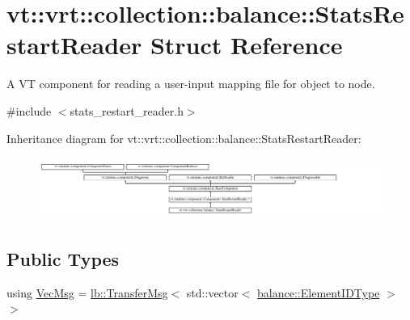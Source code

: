 \hypertarget{structvt_1_1vrt_1_1collection_1_1balance_1_1_stats_restart_reader}{}\section{vt\+:\+:vrt\+:\+:collection\+:\+:balance\+:\+:Stats\+Restart\+Reader Struct Reference}
\label{structvt_1_1vrt_1_1collection_1_1balance_1_1_stats_restart_reader}


A VT component for reading a user-\/input mapping file for object to node.  




{\ttfamily \#include $<$stats\+\_\+restart\+\_\+reader.\+h$>$}

Inheritance diagram for vt\+:\+:vrt\+:\+:collection\+:\+:balance\+:\+:Stats\+Restart\+Reader\+:\begin{figure}[H]
\begin{center}
\leavevmode
\includegraphics[height=2.034884cm]{structvt_1_1vrt_1_1collection_1_1balance_1_1_stats_restart_reader}
\end{center}
\end{figure}
\subsection*{Public Types}
\begin{DoxyCompactItemize}
\item 
using \hyperlink{structvt_1_1vrt_1_1collection_1_1balance_1_1_stats_restart_reader_a7e2a74977e595242bf3abb6c83b7e27b}{Vec\+Msg} = \hyperlink{structvt_1_1vrt_1_1collection_1_1lb_1_1_transfer_msg}{lb\+::\+Transfer\+Msg}$<$ std\+::vector$<$ \hyperlink{namespacevt_1_1vrt_1_1collection_1_1balance_a14c8d2c972f2913aa3f1636e5be0a120}{balance\+::\+Element\+I\+D\+Type} $>$ $>$
\end{DoxyCompactItemize}
